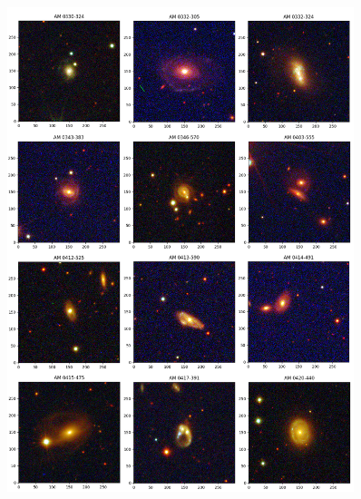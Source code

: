 \begin{anexosenv}
    \begin{figure}[h]
        \centering 
        \includegraphics[width=0.9\textwidth]{Imagens/imagem_03.png} 
        \caption[]{}
        \label{fig:imagem_03} 
    \end{figure}


\end{anexosenv}
